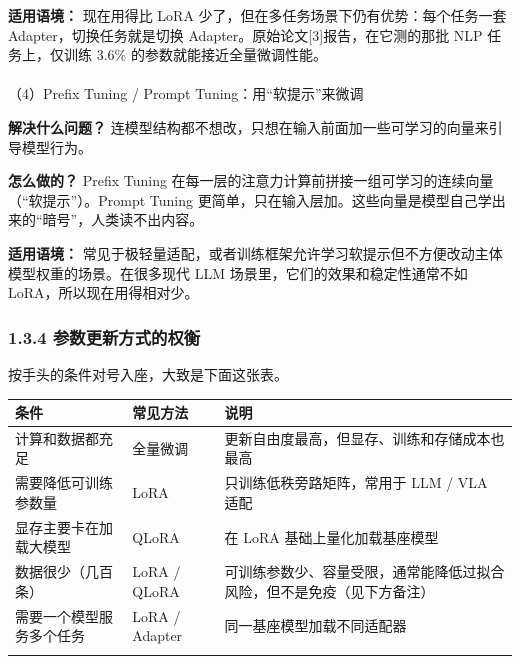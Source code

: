 \documentclass[
  chinese,
]{ctexart}
\makeatletter
\let\oldparagraph\paragraph
\renewcommand{\paragraph}{
    \@ifstar
      \xxxParagraphStar
      \xxxParagraphNoStar
  }
\newcommand{\xxxParagraphStar}[1]{\oldparagraph*{#1}\mbox{}}
\newcommand{\xxxParagraphNoStar}[1]{\oldparagraph{#1}\mbox{}}
\makeatother
\begin{document}
\textbf{适用语境：} 现在用得比 LoRA
少了，但在多任务场景下仍有优势：每个任务一套 Adapter，切换任务就是切换
Adapter。原始论文{[}3{]}报告，在它测的那批 NLP 任务上，仅训练 3.6\%
的参数就能接近全量微调性能。

\paragraph{（4）Prefix Tuning / Prompt
Tuning：用``软提示''来微调}\label{prefix-tuning-prompt-tuningux7528ux8f6fux63d0ux793aux6765ux5faeux8c03}

\textbf{解决什么问题？}
连模型结构都不想改，只想在输入前面加一些可学习的向量来引导模型行为。

\textbf{怎么做的？} Prefix Tuning
在每一层的注意力计算前拼接一组可学习的连续向量（``软提示''）。Prompt
Tuning
更简单，只在输入层加。这些向量是模型自己学出来的``暗号''，人类读不出内容。

\textbf{适用语境：}
常见于极轻量适配，或者训练框架允许学习软提示但不方便改动主体模型权重的场景。在很多现代
LLM 场景里，它们的效果和稳定性通常不如 LoRA，所以现在用得相对少。

\subsubsection{1.3.4
参数更新方式的权衡}\label{ux53c2ux6570ux66f4ux65b0ux65b9ux5f0fux7684ux6743ux8861}

按手头的条件对号入座，大致是下面这张表。

\begin{center}
\begin{tabular}{@{}>{\raggedright\arraybackslash}p{} >{\raggedright\arraybackslash}p{} >{\raggedright\arraybackslash}p{}@{}}
\toprule\noalign{}
条件 & 常见方法 & 说明 \\
\midrule\noalign{}
计算和数据都充足 & 全量微调 & 更新自由度最高，但显存、训练和存储成本也最高 \\
需要降低可训练参数量 & LoRA & 只训练低秩旁路矩阵，常用于 LLM / VLA 适配 \\
显存主要卡在加载大模型 & QLoRA & 在 LoRA 基础上量化加载基座模型 \\
数据很少（几百条） & LoRA / QLoRA & 可训练参数少、容量受限，通常能降低过拟合风险，但不是免疫（见下方备注） \\
需要一个模型服务多个任务 & LoRA / Adapter & 同一基座模型加载不同适配器 \\
\bottomrule\noalign{}
\end{tabular}
\end{center}
\end{document}
